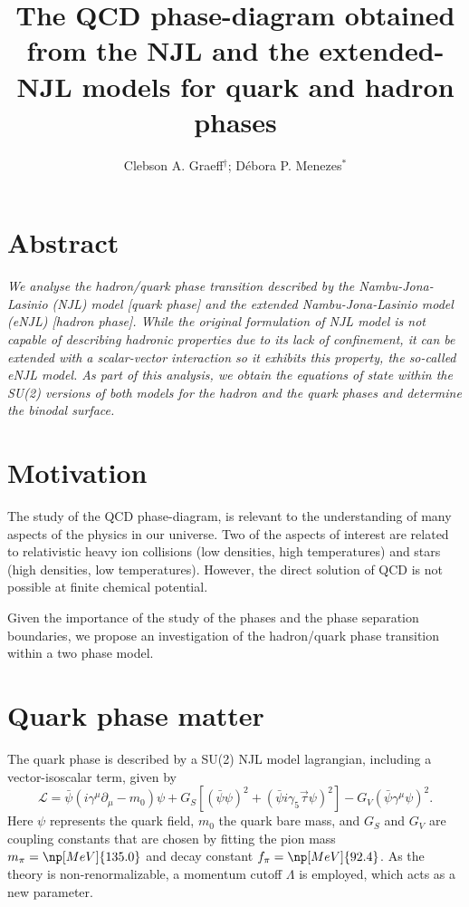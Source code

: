 \documentclass[plainsections,alongposter]{sciposterlocal}
\title{The QCD phase-diagram obtained from the NJL and the extended-NJL models for quark and hadron phases}
\author{Clebson A. Graeff$^\dagger$; Débora P. Menezes$^*$}
\institute{$^\dagger$~Universidade Tecnológica Federal do Paraná -- Pato Branco, PR - Brazil \\
$^*$~Universidade Federal de Santa Catarina -- Florian\'opolis, SC - Brazil \\
}
\begin{document}
\maketitle %

\begin{multicols}{2} %

\section*{Abstract}
{ \it
We analyse the hadron/quark phase transition described by the Nambu-Jona-Lasinio (NJL) model [quark phase] and the extended Nambu-Jona-Lasinio model (eNJL) [hadron phase]. While the original formulation of NJL model is not capable of describing hadronic properties due to its lack of confinement, it can be extended with a scalar-vector interaction so it exhibits this property, the so-called  eNJL model. As part of this analysis, we obtain the equations of state within the SU(2) versions of both models for the hadron and the quark phases and determine the binodal surface. 
}

\section*{Motivation}

The study of the QCD phase-diagram, is relevant to the understanding of many aspects of the physics in our universe. Two of the aspects of interest are related to relativistic heavy ion collisions (low densities, high temperatures) and stars (high densities, low temperatures). However, the direct solution of QCD is not possible at finite chemical potential.

Given the importance of the study of the phases and the phase separation boundaries, we propose an investigation of the hadron/quark phase transition within a two phase model.

\section*{Quark phase matter}

The quark phase is described by a SU(2) NJL model lagrangian, including a vector-isoscalar term, given by \cite{Buballa2005}
\begin{equation}\label{Eq:LagNJL-SU2-Bub}
	\mathcal{L} =\bar{\psi}(i\gamma^\mu\partial_\mu - m_0)\psi + G_S[(\bar{\psi}\psi)^2 + (\bar{\psi}i\gamma_5\vec{\tau}\psi)^2] - G_V(\bar{\psi}\gamma^\mu \psi)^2.
\end{equation}
%
Here $\psi$ represents the quark field, $m_0$ the quark bare mass, and $G_S$ and $G_V$ are coupling constants that are chosen by fitting the pion mass $m_\pi = \np[MeV]{135.0}$ and decay constant $f_\pi = \np[MeV]{92.4}$. As the theory is non-renormalizable, a momentum cutoff $\Lambda$ is employed, which acts as a new parameter.


\end{multicols}
\end{document}
